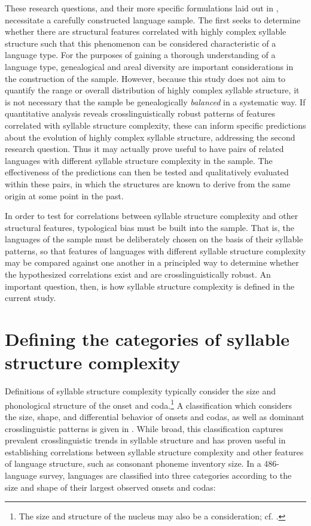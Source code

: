  These research questions, and their more specific formulations laid out in , necessitate a carefully constructed language sample. The first seeks to determine whether there are structural features correlated with highly complex syllable structure such that this phenomenon can be considered characteristic of a language type. For the purposes of gaining a thorough understanding of a language type, genealogical and areal diversity are important considerations in the construction of the sample. However, because this study does not aim to quantify the range or overall distribution of highly complex syllable structure, it is not necessary that the sample be genealogically \textit{balanced} in a systematic way. If quantitative analysis reveals crosslinguistically robust patterns of features correlated with syllable structure complexity, these can inform specific predictions about the evolution of highly complex syllable structure, addressing the second research question. Thus it may actually prove useful to have pairs of related languages with different syllable structure complexity in the sample. The effectiveness of the predictions can then be tested and qualitatively evaluated within these pairs, in which the structures are known to derive from the same origin at some point in the past.

  In order to test for correlations between syllable structure complexity and other structural features, typological bias \citep[12]{Comrie1989} must be built into the sample. That is, the languages of the sample must be deliberately chosen on the basis of their syllable patterns, so that features of languages with different syllable structure complexity may be compared against one another in a principled way to determine whether the hypothesized correlations exist and are crosslinguistically robust. An important question, then, is how syllable structure complexity is defined in the current study.

\section{Defining the categories of syllable structure complexity}\label{sec:2.2}

  Definitions of syllable structure complexity typically consider the size and phonological structure of the onset and coda.\footnote{ \textrm{The size and structure of the nucleus may also be a consideration; cf. \citet{MaddiesonEtAl2013}.}} A classification which considers the size, shape, and differential behavior of onsets and codas, as well as dominant crosslinguistic patterns is given in \citet{Maddieson2013a}. While broad, this classification captures prevalent crosslinguistic trends in syllable structure and has proven useful in establishing correlations between syllable structure complexity and other features of language structure, such as consonant phoneme inventory size. In a 486-language survey, languages are classified into three categories according to the size and shape of their largest observed onsets and codas: 

